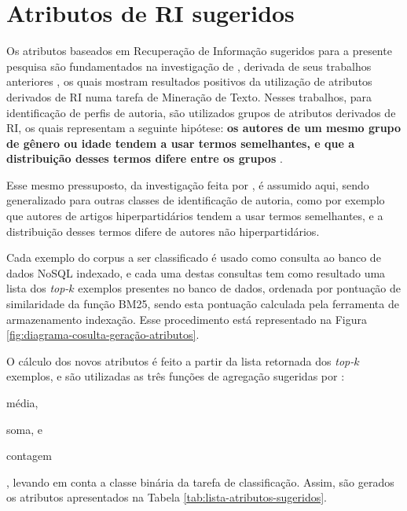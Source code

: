  



\section{Atributos de RI sugeridos}  \label{sec:Atributos-de-RI-sugeridos}
    Os atributos baseados em Recuperação de Informação sugeridos para a presente pesquisa são fundamentados na investigação de , derivada de seus trabalhos anteriores \cite{WEREN_CLEF_2014,WEREN_ARTIGO_2014}, os quais mostram resultados positivos da utilização de atributos derivados de RI numa tarefa de Mineração de Texto.
    Nesses trabalhos, para identificação de perfis de autoria, são utilizados grupos de atributos derivados de RI, os quais representam a seguinte hipótese: \textbf{os autores de um mesmo grupo de gênero ou idade tendem a usar termos semelhantes, e que a distribuição desses termos difere entre os grupos} \cite[p.~20]{WEREN_MESTRADO_2014}.
    
    Esse mesmo pressuposto, da investigação feita por , é assumido aqui, sendo generalizado para outras classes de identificação de autoria, como por exemplo que autores de artigos hiperpartidários tendem a usar termos semelhantes, e a distribuição desses termos difere de autores não hiperpartidários.
    
    
    
    Cada exemplo do corpus a ser classificado é usado como consulta ao banco de dados NoSQL indexado, e cada uma destas consultas tem como resultado uma lista dos \textit{top-$k$} exemplos presentes no banco de dados, ordenada por pontuação de similaridade da função BM25, sendo esta pontuação calculada pela ferramenta de armazenamento indexação. 
    Esse procedimento está representado na Figura \ref{fig:diagrama-cosulta-geração-atributos}.
    
    O cálculo dos novos atributos é feito a partir da lista retornada dos \textit{top-$k$} exemplos, e são utilizadas as três funções de agregação sugeridas por :
    \begin{enumerate*}[label=(\alph*)]
        \item média,
        \item soma, e
        \item contagem
    \end{enumerate*}, 
    levando em conta a classe binária da tarefa de classificação. 
    Assim, são gerados os atributos apresentados na Tabela \ref{tab:lista-atributos-sugeridos}.
    
